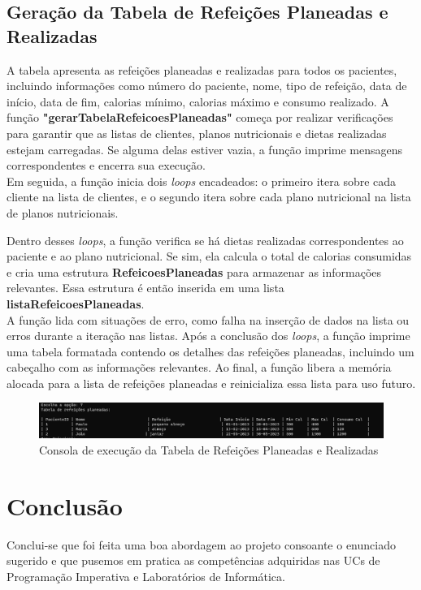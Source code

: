 \documentclass{article}
\begin{document}
\subsection{Geração da Tabela de Refeições Planeadas e Realizadas}
A tabela apresenta as refeições planeadas e realizadas para todos os pacientes, incluindo informações como número do paciente, nome, tipo de refeição, data de início, data de fim, calorias mínimo, calorias máximo e consumo realizado. A função \textbf{"gerarTabelaRefeicoesPlaneadas"} começa por realizar verificações para garantir que as listas de clientes, planos nutricionais e dietas realizadas estejam carregadas. Se alguma delas estiver vazia, a função imprime mensagens correspondentes e encerra sua execução.\\

Em seguida, a função inicia dois \emph{loops} encadeados: o primeiro itera sobre cada cliente na lista de clientes, e o segundo itera sobre cada plano nutricional na lista de planos nutricionais.

Dentro desses \emph{loops}, a função verifica se há dietas realizadas correspondentes ao paciente e ao plano nutricional. Se sim, ela calcula o total de calorias consumidas e cria uma estrutura \textbf{RefeicoesPlaneadas} para armazenar as informações relevantes. Essa estrutura é então inserida em uma lista \textbf{listaRefeicoesPlaneadas}.\\

A função lida com situações de erro, como falha na inserção de dados na lista ou erros durante a iteração nas listas.
Após a conclusão dos \emph{loops}, a função imprime uma tabela formatada contendo os detalhes das refeições planeadas, incluindo um cabeçalho com as informações relevantes.
Ao final, a função libera a memória alocada para a lista de refeições planeadas e reinicializa essa lista para uso futuro. \\

\begin{figure}[hbt!]
    \centering
    \includegraphics[width=1.1\linewidth]{Ponto6.png}
    \caption{Consola de execução da Tabela de Refeições Planeadas e Realizadas}
    \label{fig:enter-label}
\end{figure}

\newpage
\section{Conclusão}
Conclui-se que foi feita uma boa abordagem ao projeto consoante o enunciado sugerido e que pusemos em pratica as competências adquiridas nas UCs de Programação Imperativa e Laboratórios de Informática. \\
\end{document}
